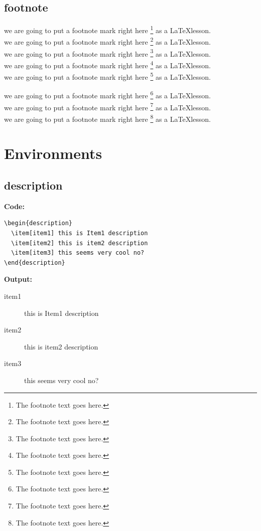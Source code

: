 \documentclass{book}
\newcommand{\myc}{\noindent\textbf{{\color{blue} Code}:}}
\newcommand{\myo}{\noindent\textbf{{\color{blue} Output}:\\}}
\begin{document}
\newpage
\section{footnote}
\noindent
we are going to put a footnote mark right here \footnote{The footnote text goes here.} as a \LaTeX lesson.\\
\noindent
we are going to put a footnote mark right here \footnote{The footnote text goes here.} as a \LaTeX lesson.\\
\noindent
we are going to put a footnote mark right here \footnote{The footnote text goes here.} as a \LaTeX lesson.\\
\noindent
we are going to put a footnote mark right here \footnote{The footnote text goes here.} as a \LaTeX lesson.\\
\noindent
we are going to put a footnote mark right here \footnote{The footnote text goes here.} as a \LaTeX lesson.\\

\setcounter{footnote}{0}

\noindent
we are going to put a footnote mark right here \footnote{The footnote text goes here.} as a \LaTeX lesson.\\
\noindent
we are going to put a footnote mark right here \footnote{The footnote text goes here.} as a \LaTeX lesson.\\
\noindent
we are going to put a footnote mark right here \footnote{The footnote text goes here.} as a \LaTeX lesson.\\


\chapter{Environments}

\section{description}

\myc
\begin{lstlisting}
\begin{description}
  \item[item1] this is Item1 description
  \item[item2] this is item2 description
  \item[item3] this seems very cool no?
\end{description}
\end{lstlisting}

\noindent
\myo
\begin{description}
  \item[item1] this is Item1 description
  \item[item2] this is item2 description
  \item[item3] this seems very cool no?
\end{description}
\end{document}
